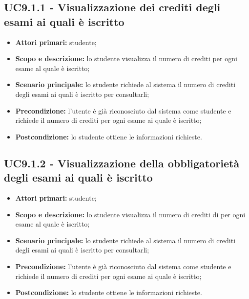\documentclass[AnalisiDeiRequisiti.tex]{subfiles}
\begin{document}
\subsection{UC9.1.1 - Visualizzazione dei crediti degli esami ai quali è iscritto}
\begin{itemize}
\item \textbf{Attori primari:} studente;
\item \textbf{Scopo e descrizione:} lo studente visualizza il numero di crediti per ogni esame al quale è iscritto;
\item \textbf{Scenario principale:} lo studente richiede al sistema il numero di crediti degli esami ai quali è iscritto per consultarli;
\item \textbf{Precondizione:} l'utente è già riconosciuto dal sistema come studente e richiede il numero di crediti per ogni esame ai quale è iscritto;
\item \textbf{Postcondizione:} lo studente ottiene le informazioni richieste.
\end{itemize}

\subsection{UC9.1.2 - Visualizzazione della obbligatorietà degli esami ai quali è iscritto}
\begin{itemize}
	\item \textbf{Attori primari:} studente;
	\item \textbf{Scopo e descrizione:} lo studente visualizza il numero di crediti di per ogni esame al quale è iscritto;
	\item \textbf{Scenario principale:} lo studente richiede al sistema il numero di crediti degli esami ai quali è iscritto per consultarli;
	\item \textbf{Precondizione:} l'utente è già riconosciuto dal sistema come studente e richiede il numero di crediti per ogni esame ai quale è iscritto;
	\item \textbf{Postcondizione:} lo studente ottiene le informazioni richieste.
\end{itemize}
\end{document}
